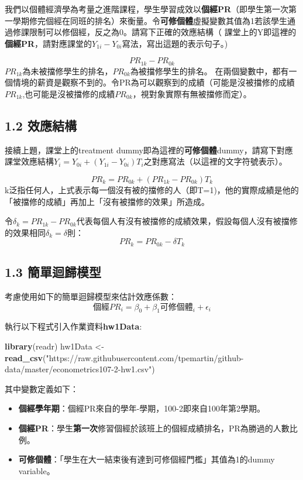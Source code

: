 \documentclass[]{article}
\newenvironment{Shaded}{\begin{snugshade}}{\end{snugshade}}
\newcommand{\KeywordTok}[1]{\textcolor[rgb]{0.13,0.29,0.53}{\textbf{#1}}}
\newcommand{\StringTok}[1]{\textcolor[rgb]{0.31,0.60,0.02}{#1}}
\newcommand{\NormalTok}[1]{#1}
\begin{document}
我們以個體經濟學為考量之進階課程，學生學習成效以\textbf{個經PR}（即學生第一次第一學期修完個經在同班的排名）來衡量。令\textbf{可修個體}虛擬變數其值為1若該學生通過修課限制可以修個經，反之為0。請寫下正確的效應結構（
課堂上的Y即這裡的
\textbf{個經PR}，請對應課堂的\(Y_{1i}-Y_{0i}\)寫法，寫出這題的表示句子。)

\[PR_{1k}-PR_{0k}\]
\(PR_{1k}\)為未被擋修學生的排名，\(PR_{0k}\)為被擋修學生的排名。
在兩個變數中，都有一個情境的薪資是觀察不到的。令PR為可以觀察到的成績（可能是沒被擋修的成績\(PR_{1k}\),也可能是沒被擋修的成績\(PR_{0k}\)，視對象實際有無被擋修而定）。

\subsection{1.2 效應結構}

接續上題，課堂上的treatment
dummy即為這裡的\textbf{可修個體}dummy，請寫下對應課堂效應結構\(Y_i=Y_{0i}+(Y_{1i}-Y_{0i})T_i\)之對應寫法（以這裡的文字符號表示）。

\[PR_{k}=PR_{0k}+(PR_{1k}-PR_{0k}) T_{k}\]
k泛指任何人，上式表示每一個沒有被的擋修的人（即T=1)，他的實際成績是他的「被擋修的成績」再加上「沒有被擋修的效果」所造成。

令\(\delta_{k}=PR_{1k}-PR_{0k}\)代表每個人有沒有被擋修的成績效果，假設每個人沒有被擋修的效果相同\(\delta_{k}=\delta\)則：
\[PR_{k}=PR_{0k}-\delta T_{k}\]

\subsection{1.3 簡單迴歸模型}

考慮使用如下的簡單迴歸模型來估計效應係數：
\[個經PR_i=\beta_0+\beta_1 可修個體_i+\epsilon_i\]

執行以下程式引入作業資料\textbf{hw1Data}:

\begin{Shaded}
\begin{Highlighting}[]
\KeywordTok{library}\NormalTok{(readr)}
\NormalTok{hw1Data <-}\StringTok{ }\KeywordTok{read_csv}\NormalTok{(}\StringTok{"https://raw.githubusercontent.com/tpemartin/github-data/master/econometrics107-2-hw1.csv"}\NormalTok{)}
\end{Highlighting}
\end{Shaded}

其中變數定義如下：

\begin{itemize}
\item
  \textbf{個經學年期}：個經PR來自的學年-學期，100-2即來自100年第2學期。
\item
  \textbf{個經PR}：學生\textbf{第一次}修習個經於該班上的個經成績排名，PR為勝過的人數比例。
\item
  \textbf{可修個體}：「學生在大一結束後有達到可修個經門檻」其值為1的dummy
  variable。
\end{itemize}
\end{document}
